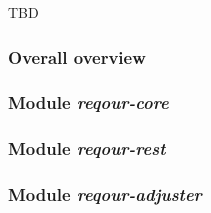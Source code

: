 \documentclass[../main.tex]{subfiles}
\begin{document}
TBD

\subsubsection*{Overall overview}


\subsubsection*{Module \textit{reqour-core}}


\subsubsection*{Module \textit{reqour-rest}}


\subsubsection*{Module \textit{reqour-adjuster}}

\end{document}
